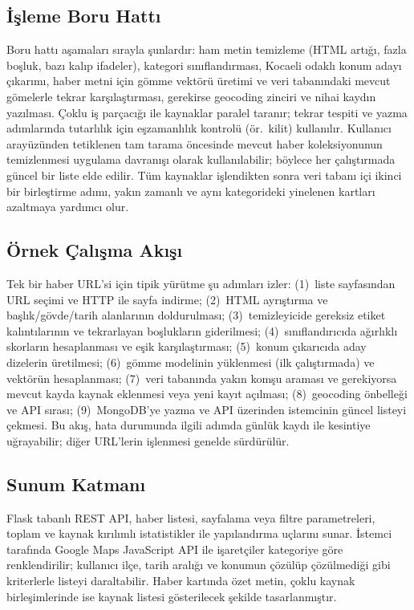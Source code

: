 \documentclass[conference,a4paper]{IEEEtran}
\begin{document}
\subsection{İşleme Boru Hattı}
Boru hattı aşamaları sırayla şunlardır: ham metin temizleme (HTML artığı, fazla boşluk, bazı kalıp ifadeler), kategori sınıflandırması, Kocaeli odaklı konum adayı çıkarımı, haber metni için gömme vektörü üretimi ve veri tabanındaki mevcut gömelerle tekrar karşılaştırması, gerekirse geocoding zinciri ve nihai kaydın yazılması. Çoklu iş parçacığı ile kaynaklar paralel taranır; tekrar tespiti ve yazma adımlarında tutarlılık için eşzamanlılık kontrolü (ör.\ kilit) kullanılır. Kullanıcı arayüzünden tetiklenen tam tarama öncesinde mevcut haber koleksiyonunun temizlenmesi uygulama davranışı olarak kullanılabilir; böylece her çalıştırmada güncel bir liste elde edilir. Tüm kaynaklar işlendikten sonra veri tabanı içi ikinci bir birleştirme adımı, yakın zamanlı ve aynı kategorideki yinelenen kartları azaltmaya yardımcı olur.

\subsection{Örnek Çalışma Akışı}
Tek bir haber URL'si için tipik yürütme şu adımları izler: (1)~liste sayfasından URL seçimi ve HTTP ile sayfa indirme; (2)~HTML ayrıştırma ve başlık/gövde/tarih alanlarının doldurulması; (3)~temizleyicide gereksiz etiket kalıntılarının ve tekrarlayan boşlukların giderilmesi; (4)~sınıflandırıcıda ağırlıklı skorların hesaplanması ve eşik karşılaştırması; (5)~konum çıkarıcıda aday dizelerin üretilmesi; (6)~gömme modelinin yüklenmesi (ilk çalıştırmada) ve vektörün hesaplanması; (7)~veri tabanında yakın komşu araması ve gerekiyorsa mevcut kayda kaynak eklenmesi veya yeni kayıt açılması; (8)~geocoding önbelleği ve API sırası; (9)~MongoDB'ye yazma ve API üzerinden istemcinin güncel listeyi çekmesi. Bu akış, hata durumunda ilgili adımda günlük kaydı ile kesintiye uğrayabilir; diğer URL'lerin işlenmesi genelde sürdürülür.

\subsection{Sunum Katmanı}
Flask tabanlı REST API, haber listesi, sayfalama veya filtre parametreleri, toplam ve kaynak kırılımlı istatistikler ile yapılandırma uçlarını sunar. İstemci tarafında Google Maps JavaScript API ile işaretçiler kategoriye göre renklendirilir; kullanıcı ilçe, tarih aralığı ve konumun çözülüp çözülmediği gibi kriterlerle listeyi daraltabilir. Haber kartında özet metin, çoklu kaynak birleşimlerinde ise kaynak listesi gösterilecek şekilde tasarlanmıştır.
\end{document}
